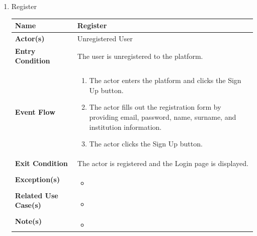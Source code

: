 \begin{enumerate}
    \item Register
    \begin{center}
        \begin{tabular}{ | m{10em} | m{10cm}| } 
          \hline
          \textbf{Name} & Register  \\ 
          \hline
         \textbf{Actor(s)} & Unregistered User \\ 
          \hline
          \textbf{Entry Condition} & The user is unregistered to the platform. \\ 
          \hline
          \textbf{Event Flow} & 
          \begin{enumerate}[(1)]
              \item The actor enters the platform and clicks the Sign Up button.
              \item The actor fills out the registration form by providing email, password, name, surname, and institution information.
              \item The actor clicks the Sign Up button.
          \end{enumerate} \\
          \hline
          \textbf{Exit Condition} & The actor is registered and the Login page is displayed.  \\ 
          \hline
          \textbf{Exception(s)} & 
          \begin{itemize}
          \item 
      \end{itemize}
      \\ 
          \hline
          \textbf{Related Use Case(s)} & \begin{itemize}
          \item 
      \end{itemize}  \\ 
          \hline
          \textbf{Note(s)} & \begin{itemize}
          \item 
      \end{itemize}  \\ 
          \hline
        \end{tabular}
    \end{center}



\end{enumerate}
